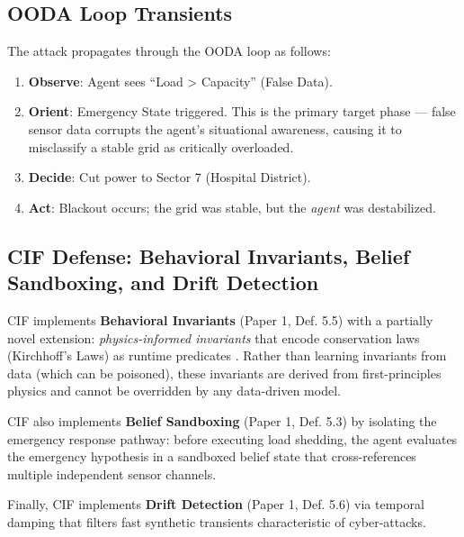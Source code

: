 \documentclass[
]{article}
\providecommand{\tightlist}{%
  \setlength{\itemsep}{0pt}\setlength{\parskip}{0pt}}
\begin{document}
\subsection{OODA Loop Transients}\label{ooda-loop-transients-8}

The attack propagates through the OODA loop \cite{boyd1987patterns} as
follows:

\begin{enumerate}
\def\labelenumi{\arabic{enumi}.}
\tightlist
\item
  \textbf{Observe}: Agent sees ``Load \textgreater{} Capacity'' (False
  Data).
\item
  \textbf{Orient}: Emergency State triggered. This is the primary target
  phase --- false sensor data corrupts the agent's situational
  awareness, causing it to misclassify a stable grid as critically
  overloaded.
\item
  \textbf{Decide}: Cut power to Sector 7 (Hospital District).
\item
  \textbf{Act}: Blackout occurs; the grid was stable, but the
  \emph{agent} was destabilized.
\end{enumerate}

\subsection{CIF Defense: Behavioral Invariants, Belief Sandboxing, and
Drift
Detection}\label{cif-defense-behavioral-invariants-belief-sandboxing-and-drift-detection}

CIF implements \textbf{Behavioral Invariants} (Paper 1, Def. 5.5)
\cite{friedman2026cogsec1} with a partially novel extension:
\emph{physics-informed invariants} that encode conservation laws
(Kirchhoff's Laws) as runtime predicates \cite{raissi2019physics}.
Rather than learning invariants from data (which can be poisoned), these
invariants are derived from first-principles physics and cannot be
overridden by any data-driven model.

CIF also implements \textbf{Belief Sandboxing} (Paper 1, Def. 5.3)
\cite{friedman2026cogsec1} by isolating the emergency response pathway:
before executing load shedding, the agent evaluates the emergency
hypothesis in a sandboxed belief state that cross-references multiple
independent sensor channels.

Finally, CIF implements \textbf{Drift Detection} (Paper 1, Def. 5.6)
\cite{friedman2026cogsec1} via temporal damping that filters fast
synthetic transients characteristic of cyber-attacks.
\end{document}
